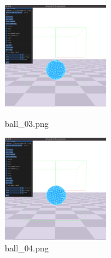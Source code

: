 \documentclass[a4paper,10pt,uplatex,dvipdfmx]{jsarticle}
\begin{document}
\begin{figure}[H]
  \begin{minipage}{0.33\hsize}
    \begin{center}
      \includegraphics[width=45mm]{img/ball_03.png}
      \caption{ball\_03.png}
    \end{center}
  \end{minipage}
  \begin{minipage}{0.33\hsize}
    \begin{center}
      \includegraphics[width=45mm]{img/ball_04.png}
      \caption{ball\_04.png}
    \end{center}
  \end{minipage}
\end{figure}
\end{document}
